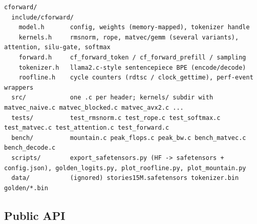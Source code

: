 \begin{lstlisting}[style=plain]
cforward/
  include/cforward/
    model.h       config, weights (memory-mapped), tokenizer handle
    kernels.h     rmsnorm, rope, matvec/gemm (several variants), attention, silu-gate, softmax
    forward.h     cf_forward_token / cf_forward_prefill / sampling
    tokenizer.h   llama2.c-style sentencepiece BPE (encode/decode)
    roofline.h    cycle counters (rdtsc / clock_gettime), perf-event wrappers
  src/            one .c per header; kernels/ subdir with matvec_naive.c matvec_blocked.c matvec_avx2.c ...
  tests/          test_rmsnorm.c test_rope.c test_softmax.c test_matvec.c test_attention.c test_forward.c
  bench/          mountain.c peak_flops.c peak_bw.c bench_matvec.c bench_decode.c
  scripts/        export_safetensors.py (HF -> safetensors + config.json), golden_logits.py, plot_roofline.py, plot_mountain.py
  data/           (ignored) stories15M.safetensors tokenizer.bin golden/*.bin
\end{lstlisting}

\subsection{Public API}

